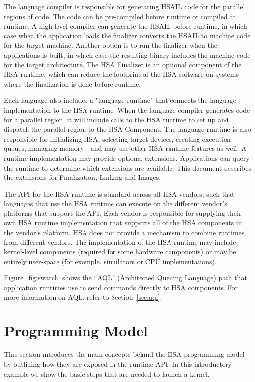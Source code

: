 \documentclass[final]{book}
\begin{document}
The language compiler is responsible for generating HSAIL code for the parallel
regions of code. The code can be pre-compiled before runtime or compiled at
runtime. A high-level compiler can generate the HSAIL before runtime, in which
case when the application loads the finalizer converts the HSAIL to machine
code for the target machine. Another option is to run the finalizer when
the applications is built, in which case the resulting binary includes the machine
code for the target architecture. The HSA Finalizer is an optional component of
the HSA runtime, which can reduce the footprint of the HSA software on systems
where the finalization is done before runtime.

Each language also includes a "language runtime" that connects the language
implementation to the HSA runtime. When the language compiler generates code for
a parallel region, it will include calls to the HSA runtime to set up and
dispatch the parallel region to the HSA Component. The language runtime is also
responsible for initializing HSA, selecting target devices, creating execution
queues, managing memory - and may use other HSA runtime features as well.
A runtime implementation may provide optional extensions. Applications can
query the runtime to determine which extensions are available. This document
describes the extensions for Finalization, Linking and Images.

The API for the HSA runtime is standard across all HSA vendors, such that
languages that use the HSA runtime can execute on the different vendor's
platforms that support the API. Each vendor is responsible for supplying their
own HSA runtime implementation that supports all of the HSA components in the
vendor's platform. HSA does not provide a mechanism to combine runtimes from
different vendors. The implementation of the HSA runtime may include
kernel-level components (required for some hardware components) or may be entirely
user-space (for example, simulators or CPU implementations).

Figure~\ref{fig:swarch} shows the ``AQL'' (Architected Queuing
Language) path that application runtimes use to send commands directly to
HSA components. For more information on AQL, refer to Section~\ref{sec:aql}.


\section{Programming Model}\label{sec:executionmodel}

This section introduces the main concepts behind the HSA programming model by
outlining how they are exposed in the runtime API. In this introductory example
we show the basic steps that are needed to launch a kernel.
\end{document}

